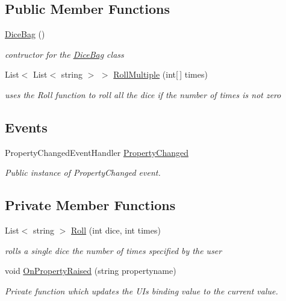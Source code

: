 \subsection*{Public Member Functions}
\begin{DoxyCompactItemize}
\item 
\mbox{\hyperlink{class_dungeons__n___dragons___manager_1_1_models_1_1_dice_bag_a0015aea34ce40a3865465a096d28b6e0}{Dice\+Bag}} ()
\begin{DoxyCompactList}\small\item\em contructor for the \mbox{\hyperlink{class_dungeons__n___dragons___manager_1_1_models_1_1_dice_bag}{Dice\+Bag}} class \end{DoxyCompactList}\item 
List$<$ List$<$ string $>$ $>$ \mbox{\hyperlink{class_dungeons__n___dragons___manager_1_1_models_1_1_dice_bag_a1429fe1d9eb02bf0ad2604094da1edf6}{Roll\+Multiple}} (int\mbox{[}$\,$\mbox{]} times)
\begin{DoxyCompactList}\small\item\em uses the Roll function to roll all the dice if the number of times is not zero \end{DoxyCompactList}\end{DoxyCompactItemize}
\subsection*{Events}
\begin{DoxyCompactItemize}
\item 
Property\+Changed\+Event\+Handler \mbox{\hyperlink{class_dungeons__n___dragons___manager_1_1_models_1_1_dice_bag_a3af8426fceed5fb4a66909af5d7242af}{Property\+Changed}}
\begin{DoxyCompactList}\small\item\em Public instance of Property\+Changed event. \end{DoxyCompactList}\end{DoxyCompactItemize}
\subsection*{Private Member Functions}
\begin{DoxyCompactItemize}
\item 
List$<$ string $>$ \mbox{\hyperlink{class_dungeons__n___dragons___manager_1_1_models_1_1_dice_bag_a53f74f01ef6abae6b927331d7be8fd1e}{Roll}} (int dice, int times)
\begin{DoxyCompactList}\small\item\em rolls a single dice the number of times specified by the user \end{DoxyCompactList}\item 
void \mbox{\hyperlink{class_dungeons__n___dragons___manager_1_1_models_1_1_dice_bag_a6001ba93e4684b78d307c183e6e2ce81}{On\+Property\+Raised}} (string propertyname)
\begin{DoxyCompactList}\small\item\em Private function which updates the UI\textquotesingle{}s binding value to the current value. \end{DoxyCompactList}\end{DoxyCompactItemize}
